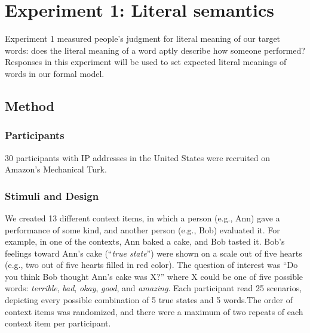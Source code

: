 \documentclass[10pt,letterpaper]{article}
\begin{document}
%



\section{Experiment 1: Literal semantics}

Experiment 1 measured people's judgment for literal meaning of our target words: 
does the literal meaning of a word aptly describe how someone performed?
Responses in this experiment will be used to set expected literal meanings of words in our formal model.

\subsection{Method}

\subsubsection{Participants}

30 participants with IP addresses in the United States were recruited on Amazon's Mechanical Turk. 

\subsubsection{Stimuli and Design}

We created 13 different context items, in which a person (e.g., Ann) gave a performance of some kind, and another person (e.g., Bob) evaluated it. For example, in one of the contexts, Ann baked a cake, and Bob tasted it. Bob's feelings toward Ann's cake (``\emph{true state}'') were shown on a scale out of five hearts (e.g., two out of five hearts filled in red color). The question of interest was ``Do you think Bob thought Ann's cake was X?'' where X could be one of five possible words: \emph{terrible}, \emph{bad}, \emph{okay}, \emph{good}, and \emph{amazing}. Each participant read 25 scenarios, depicting every possible combination of 5 true states and 5 words.The order of context items was randomized, and there were a maximum of two repeats of each context item per participant.
\end{document}
